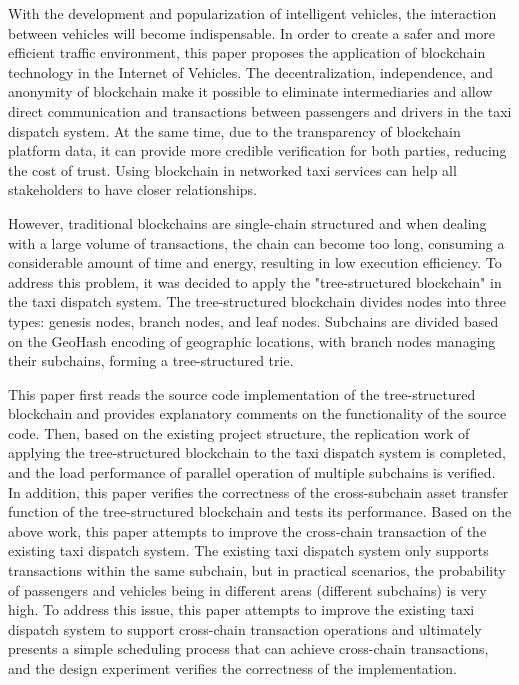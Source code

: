 \begin{abstract*}
    With the development and popularization of intelligent vehicles, the interaction between vehicles will become indispensable. In order to create a safer and more efficient traffic environment, this paper proposes the application of blockchain technology in the Internet of Vehicles. The decentralization, independence, and anonymity of blockchain make it possible to eliminate intermediaries and allow direct communication and transactions between passengers and drivers in the taxi dispatch system. At the same time, due to the transparency of blockchain platform data, it can provide more credible verification for both parties, reducing the cost of trust. Using blockchain in networked taxi services can help all stakeholders to have closer relationships.
    
    However, traditional blockchains are single-chain structured and when dealing with a large volume of transactions, the chain can become too long, consuming a considerable amount of time and energy, resulting in low execution efficiency. To address this problem, it was decided to apply the "tree-structured blockchain" in the taxi dispatch system. The tree-structured blockchain divides nodes into three types: genesis nodes, branch nodes, and leaf nodes. Subchains are divided based on the GeoHash encoding of geographic locations, with branch nodes managing their subchains, forming a tree-structured trie.
    
    This paper first reads the source code implementation of the tree-structured blockchain and provides explanatory comments on the functionality of the source code. Then, based on the existing project structure, the replication work of applying the tree-structured blockchain to the taxi dispatch system is completed, and the load performance of parallel operation of multiple subchains is verified. In addition, this paper verifies the correctness of the cross-subchain asset transfer function of the tree-structured blockchain and tests its performance. Based on the above work, this paper attempts to improve the cross-chain transaction of the existing taxi dispatch system. The existing taxi dispatch system only supports transactions within the same subchain, but in practical scenarios, the probability of passengers and vehicles being in different areas (different subchains) is very high. To address this issue, this paper attempts to improve the existing taxi dispatch system to support cross-chain transaction operations and ultimately presents a simple scheduling process that can achieve cross-chain transactions, and the design experiment verifies the correctness of the implementation.


\end{abstract*}
